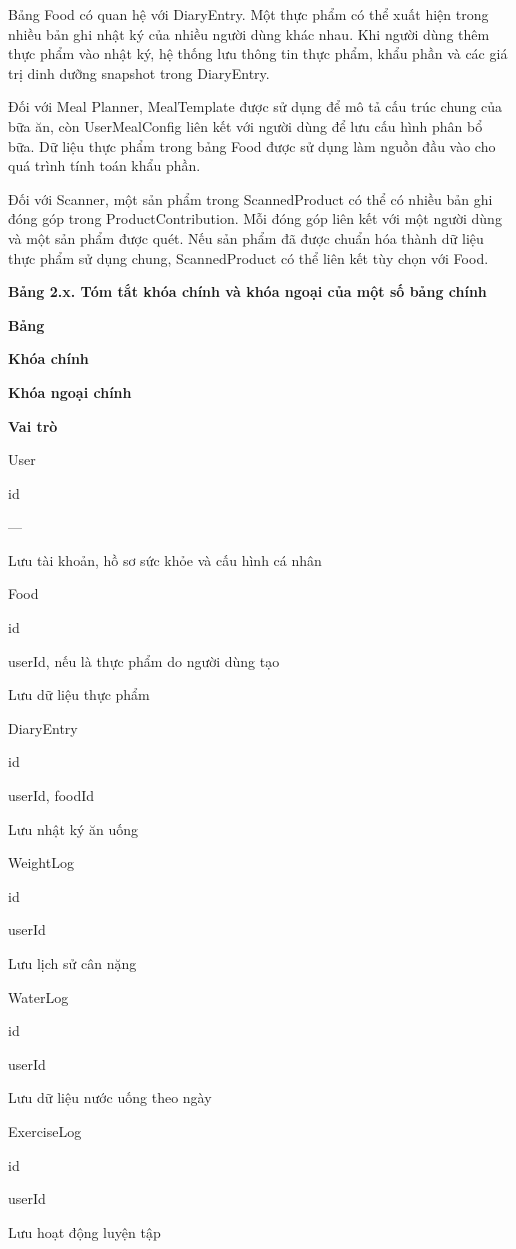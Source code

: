 Bảng Food có quan hệ với DiaryEntry. Một thực phẩm có thể xuất hiện trong nhiều bản ghi nhật ký của nhiều người dùng khác nhau. Khi người dùng thêm thực phẩm vào nhật ký, hệ thống lưu thông tin thực phẩm, khẩu phần và các giá trị dinh dưỡng snapshot trong DiaryEntry.

Đối với Meal Planner, MealTemplate được sử dụng để mô tả cấu trúc chung của bữa ăn, còn UserMealConfig liên kết với người dùng để lưu cấu hình phân bổ bữa. Dữ liệu thực phẩm trong bảng Food được sử dụng làm nguồn đầu vào cho quá trình tính toán khẩu phần.

Đối với Scanner, một sản phẩm trong ScannedProduct có thể có nhiều bản ghi đóng góp trong ProductContribution. Mỗi đóng góp liên kết với một người dùng và một sản phẩm được quét. Nếu sản phẩm đã được chuẩn hóa thành dữ liệu thực phẩm sử dụng chung, ScannedProduct có thể liên kết tùy chọn với Food.

\textbf{Bảng 2.x. Tóm tắt khóa chính và khóa ngoại của một số bảng chính}

\textbf{Bảng}

\textbf{Khóa chính}

\textbf{Khóa ngoại chính}

\textbf{Vai trò}

User

id

—

Lưu tài khoản, hồ sơ sức khỏe và cấu hình cá nhân

Food

id

userId, nếu là thực phẩm do người dùng tạo

Lưu dữ liệu thực phẩm

DiaryEntry

id

userId, foodId

Lưu nhật ký ăn uống

WeightLog

id

userId

Lưu lịch sử cân nặng

WaterLog

id

userId

Lưu dữ liệu nước uống theo ngày

ExerciseLog

id

userId

Lưu hoạt động luyện tập

